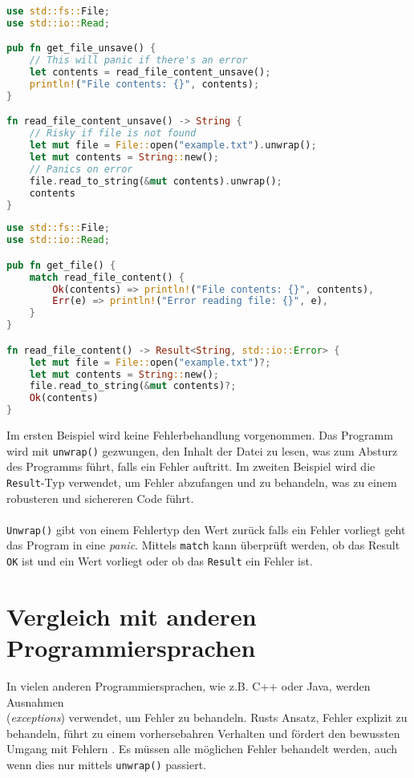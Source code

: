 \begin{lstlisting}[language=Rust, caption=Unsichere Fehlerbehandlung]
use std::fs::File;
use std::io::Read;

pub fn get_file_unsave() {
    // This will panic if there's an error
    let contents = read_file_content_unsave(); 
    println!("File contents: {}", contents);
}

fn read_file_content_unsave() -> String {
    // Risky if file is not found
    let mut file = File::open("example.txt").unwrap();  
    let mut contents = String::new();
    // Panics on error
    file.read_to_string(&mut contents).unwrap();  
    contents
}
\end{lstlisting}
\cleardoublepage
\begin{lstlisting}[language=Rust, caption=Sichere Fehlerbehandlung]
use std::fs::File;
use std::io::Read;

pub fn get_file() {
    match read_file_content() {
        Ok(contents) => println!("File contents: {}", contents),
        Err(e) => println!("Error reading file: {}", e),
    }
}

fn read_file_content() -> Result<String, std::io::Error> {
    let mut file = File::open("example.txt")?;
    let mut contents = String::new();
    file.read_to_string(&mut contents)?;
    Ok(contents)
}
\end{lstlisting}
\noindent
Im ersten Beispiel wird keine Fehlerbehandlung vorgenommen. 
Das Programm wird mit \texttt{unwrap()} gezwungen, den Inhalt der Datei zu lesen, was zum Absturz des Programms führt, falls ein Fehler auftritt. Im zweiten Beispiel wird die \texttt{Result}-Typ verwendet, um Fehler abzufangen und zu behandeln, was zu einem robusteren und sichereren Code führt.\\
\\
\texttt{Unwrap()} gibt von einem Fehlertyp den Wert zurück falls ein Fehler vorliegt geht das Program in eine \textit{\gls{panic}}. 
Mittels \texttt{match} kann überprüft werden, ob das Result \texttt{OK} ist und ein Wert vorliegt oder ob das \texttt{Result} ein Fehler ist.

\section{Vergleich mit anderen Programmiersprachen}
In vielen anderen Programmiersprachen, wie z.B. C++ oder Java, werden Ausnahmen \\ (\textit{\glspl{exception}}) verwendet, um Fehler zu behandeln. 
Rusts Ansatz, Fehler explizit zu behandeln, führt zu einem vorhersebahren Verhalten und fördert den bewussten Umgang mit Fehlern \cite[Kapitel 9]{rust2023}. Es müssen alle möglichen Fehler behandelt werden, auch wenn dies nur mittels \texttt{unwrap()} passiert.

